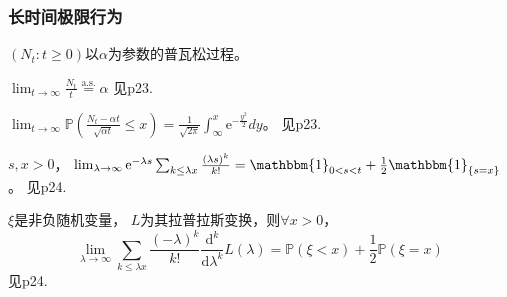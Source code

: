 \documentclass[main]{subfiles}
\begin{document}
\subsubsection{长时间极限行为}
\((N_t: t \geq 0)\)以\(\alpha\)为参数的普瓦松过程。
\begin{theorem}\label{the:普瓦松过程的强大数定律}
  \(\lim_{t \to \infty} \frac{N_t}{t} \overset{\text{a.s.}}{=} \alpha\)
  见p23.
\end{theorem}
\begin{theorem}\label{the:普瓦松过程的中心极限定理}
  \(\lim_{t \to \infty}\mathbb{P}(\frac{N_t-\alpha t}{\sqrt{\alpha t}} \leq x) = \frac{1}{\sqrt{2\pi}}\int_{\infty}^x \mathrm{e}^{-\frac{y^2}{2}}dy\)。
  见p23.
\end{theorem}
\begin{corollary}\label{cor:1.4.6}
  \(s,x >0\)， \(\lim_{\lambda \to \infty}\mathrm{e}^{-\lambda s}\sum_{k \leq \lambda x}\frac{(\lambda s)^k}{k!}=\mathbbm{1}_{0<s<t}+\frac{1}{2}\mathbbm{1}_{\{s=x\}}\)。
  见p24.
\end{corollary}
\begin{theorem}\label{the:拉普拉斯变换的反演公式}
  \(\xi\)是非负随机变量， \(L\)为其拉普拉斯变换，则\(\forall x >0\)，
  \[
    \lim_{\lambda \to \infty}\sum_{k \leq \lambda x}\frac{(-\lambda)^k}{k!} \frac{\mathrm{d}^k}{\mathrm{d} \lambda^k}L(\lambda)=\mathbb{P}(\xi <x) + \frac{1}{2} \mathbb{P}(\xi=x)
  \]
  见p24.
\end{theorem}
\end{document}
